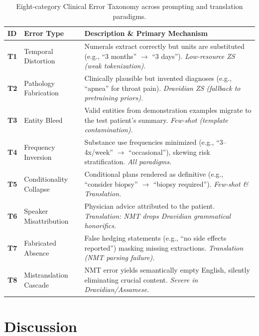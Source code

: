 \documentclass[conference]{IEEEtran}
\begin{document}
\begin{table}[h!]
\centering
\small
\caption{Eight-category Clinical Error Taxonomy across prompting and
translation paradigms.}
\label{tab:error_taxonomy}
\begin{tabularx}{\columnwidth}{l >{\raggedright\arraybackslash}p{2.0cm} X}
\toprule
\textbf{ID} & \textbf{Error Type} & \textbf{Description \& Primary Mechanism} \\
\midrule
\textbf{T1} & Temporal Distortion & Numerals extract correctly but units are substituted (e.g., ``3 months'' $\to$ ``3 days''). \textit{Low-resource ZS (weak tokenization).} \\
\addlinespace
\textbf{T2} & Pathology Fabrication & Clinically plausible but invented diagnoses (e.g., ``apnea'' for throat pain). \textit{Dravidian ZS (fallback to pretraining priors).} \\
\addlinespace
\textbf{T3} & Entity Bleed & Valid entities from demonstration examples migrate to the test patient's summary. \textit{Few-shot (template contamination).} \\
\addlinespace
\textbf{T4} & Frequency Inversion & Substance use frequencies minimized (e.g., ``3--4x/week'' $\to$ ``occasional''), skewing risk stratification. \textit{All paradigms.} \\
\addlinespace
\textbf{T5} & Conditionality Collapse & Conditional plans rendered as definitive (e.g., ``consider biopsy'' $\to$ ``biopsy required''). \textit{Few-shot \& Translation.} \\
\addlinespace
\textbf{T6} & Speaker Misattribution & Physician advice attributed to the patient. \textit{Translation: NMT drops Dravidian grammatical honorifics.} \\
\addlinespace
\textbf{T7} & Fabricated Absence & False hedging statements (e.g., ``no side effects reported'') masking missing extractions. \textit{Translation (NMT parsing failure).} \\
\addlinespace
\textbf{T8} & Mistranslation Cascade & NMT error yields semantically empty English, silently eliminating crucial content. \textit{Severe in Dravidian/Assamese.} \\
\bottomrule
\end{tabularx}
\end{table}

\section{Discussion}
\end{document}
